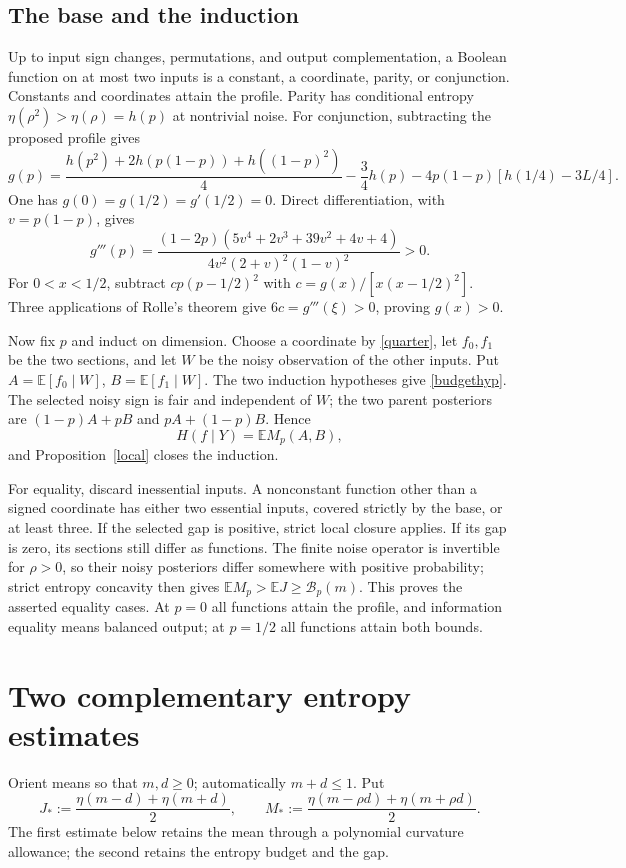 \documentclass[11pt]{article}
\newcommand{\E}{\mathbb E}\newcommand{\Prb}{\mathbb P}
\newcommand{\B}{\mathcal B_p}\newcommand{\dd}{\,\mathrm d}
\numberwithin{equation}{section}
\begin{document}
\subsection*{The base and the induction}
Up to input sign changes, permutations, and output complementation, a Boolean function on at most two inputs is a constant, a coordinate, parity, or conjunction. Constants and coordinates attain the profile. Parity has conditional entropy $\eta(\rho^2)>\eta(\rho)=h(p)$ at nontrivial noise. For conjunction, subtracting the proposed profile gives
\[
 g(p)=\frac{h(p^2)+2h(p(1-p))+h((1-p)^2)}4
 -\frac34h(p)-4p(1-p)[h(1/4)-3L/4].
\]
One has $g(0)=g(1/2)=g'(1/2)=0$. Direct differentiation, with $v=p(1-p)$, gives
\[
 g'''(p)=\frac{(1-2p)(5v^4+2v^3+39v^2+4v+4)}
 {4v^2(2+v)^2(1-v)^2}>0.
\]
For $0<x<1/2$, subtract $c p(p-1/2)^2$ with $c=g(x)/[x(x-1/2)^2]$. Three applications of Rolle's theorem give $6c=g'''(\xi)>0$, proving $g(x)>0$.

Now fix $p$ and induct on dimension. Choose a coordinate by \eqref{quarter}, let $f_0,f_1$ be the two sections, and let $W$ be the noisy observation of the other inputs. Put $A=\E[f_0\mid W]$, $B=\E[f_1\mid W]$. The two induction hypotheses give \eqref{budgethyp}. The selected noisy sign is fair and independent of $W$; the two parent posteriors are $(1-p)A+pB$ and $pA+(1-p)B$. Hence
\[
 H(f\mid Y)=\E M_p(A,B),
\]
and Proposition~\ref{local} closes the induction.

For equality, discard inessential inputs. A nonconstant function other than a signed coordinate has either two essential inputs, covered strictly by the base, or at least three. If the selected gap is positive, strict local closure applies. If its gap is zero, its sections still differ as functions. The finite noise operator is invertible for $\rho>0$, so their noisy posteriors differ somewhere with positive probability; strict entropy concavity then gives $\E M_p>\E J\ge\B(m)$. This proves the asserted equality cases. At $p=0$ all functions attain the profile, and information equality means balanced output; at $p=1/2$ all functions attain both bounds.

\section{Two complementary entropy estimates}
Orient means so that $m,d\ge0$; automatically $m+d\le1$. Put
\[
 J_*:=\frac{\eta(m-d)+\eta(m+d)}2,\qquad
 M_*:=\frac{\eta(m-\rho d)+\eta(m+\rho d)}2.
\]
The first estimate below retains the mean through a polynomial curvature allowance;
the second retains the entropy budget and the gap.
\end{document}
